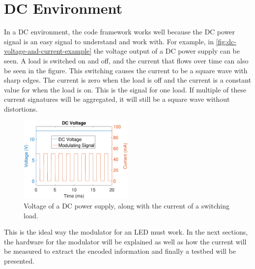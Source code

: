 
\section{DC Environment}
\label{sec:dc-environment}





In a DC environment, the code framework works well because the DC power signal is an easy signal to understand and work with.
For example, in \autoref{fig:dc-voltage-and-current-example} the voltage output of a DC power supply can be seen.
A load is switched on and off, and the current that flows over time can also be seen in the figure.
This switching causes the current to be a square wave with sharp edges.
The current is zero when the load is off and the current is a constant value for when the load is on.
This is the signal for one load.
If multiple of these current signatures will be aggregated, it will still be a square wave without distortions.

\begin{figure}[ht]
  \centering
  \includegraphics[angle=0,width=0.5\textwidth]{chapters/hardware-chapters/DC/dc-voltage-and-current-example.eps}
  \caption{Voltage of a DC power supply, along with the current of a switching load.}
  \label{fig:dc-voltage-and-current-example}
\end{figure}



This is the ideal way the modulator for an LED must work.
In the next sections, the hardware for the modulator will be explained as well as how the current will be measured to extract the encoded information and finally a testbed will be presented. 










